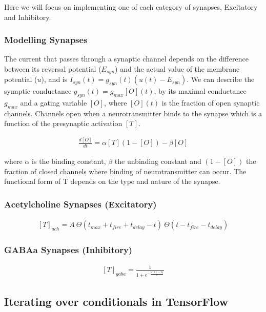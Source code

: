 \documentclass[10pt,letterpaper]{article}
\begin{document}
Here we will focus on implementing one of each category of synapses, Excitatory and Inhibitory. 

\subsubsection*{Modelling Synapses}

The current that passes through a synaptic channel depends on the difference between its reversal potential ($E_{syn}$) and the actual value of the membrane potential ($u$), and is $I_{syn}(t)=g_{syn}(t)(u(t)−E_{syn})$. We can describe the synaptic conductance $g_{syn}(t)=g_{max}[O](t)$, by its maximal conductance $g_{max}$ and a gating variable $[O]$, where $[O](𝑡)$ is the fraction of open synaptic channels. Channels open when a neurotransmitter binds to the synapse which is a function of the presynaptic activation $[T]$.

\begin{eqnarray}\label{d4_1}\frac{d[O]}{dt}=\alpha[T](1−[O])−\beta[O]\end{eqnarray}

where $\alpha$ is the binding constant, $\beta$ the unbinding constant and $(1−[O])$ the fraction of closed channels where binding of neurotransmitter can occur. The functional form of T depends on the type and nature of the synapse.
	

\subsubsection*{Acetylcholine Synapses (Excitatory)}

\begin{eqnarray}\label{d4_2}[T]_{ach} = A\ \Theta(t_{max}+t_{fire}+t_{delay}-t)\ \Theta(t-t_{fire}-t_{delay})\end{eqnarray}

\subsubsection*{GABAa Synapses (Inhibitory)}

\begin{eqnarray}\label{d4_3}[T]_{gaba} = \frac{1}{1+e^{-\frac{V(t)-V_0}{\sigma}}}\end{eqnarray}

\subsection*{Iterating over conditionals in TensorFlow}
\end{document}
